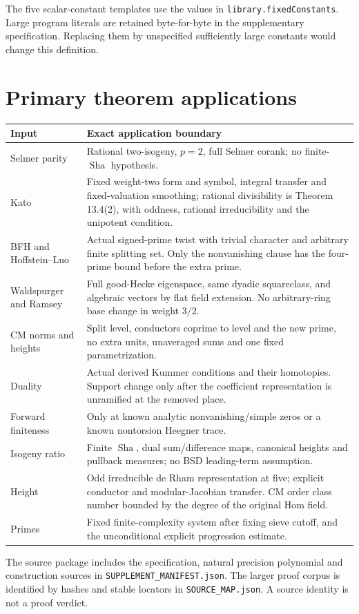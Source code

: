 \documentclass[11pt]{article}
\theoremstyle{definition}
\theoremstyle{remark}
\newcommand{\Sha}{\operatorname{Sha}}
\begin{document}
The five scalar-constant templates use the values in
\texttt{library.fixedConstants}. Large program literals are retained
byte-for-byte in the supplementary specification. Replacing them by
unspecified sufficiently large constants would change this definition.

\section{Primary theorem applications}
\begin{longtable}{p{}p{}}
\toprule Input & Exact application boundary\\\midrule\endhead
Selmer parity \cite{dd} & Rational two-isogeny, $p=2$, full Selmer corank;
no finite-$\Sha$ hypothesis.\\
Kato \cite{kato} & Fixed weight-two form and symbol, integral transfer and
fixed-valuation smoothing; rational divisibility is Theorem 13.4(2),
with oddness, rational irreducibility and the unipotent condition.\\
BFH and Hoffstein--Luo \cite{bfh,hl} & Actual signed-prime twist with
trivial character and arbitrary finite splitting set. Only the
nonvanishing clause has the four-prime bound before the extra prime.\\
Waldspurger and Ramsey \cite{waldspurger,ramsey} & Full good-Hecke
eigenspace, same dyadic squareclass, and algebraic vectors by flat
field extension. No arbitrary-ring base change in weight $3/2$.\\
CM norms and heights \cite{ccl,cst,cornutjetchev} & Split level,
conductors coprime to level and the new prime, no extra units,
unaveraged sums and one fixed parametrization.\\
Duality \cite{milne,nekovar} & Actual derived Kummer conditions and their
homotopies. Support change only after the coefficient representation
is unramified at the removed place.\\
Forward finiteness \cite{gz,kolyvagin} & Only at known analytic
nonvanishing/simple zeros or a known nontorsion Heegner trace.\\
Isogeny ratio \cite[proof of I.7.3]{milne} & Finite $\Sha$, dual
sum/difference maps, canonical heights and pullback measures;
no BSD leading-term assumption.\\
Height \cite{pan2022,javanpeykar,gr2014,fowler,cmheight,pazuki} &
Odd irreducible de Rham representation at five; explicit conductor
and modular-Jacobian transfer. CM order class number bounded by
the degree of the original Hom field.\\
Primes \cite{greentao,moebius,gtz,bmor} & Fixed finite-complexity system
after fixing sieve cutoff, and the unconditional explicit progression
estimate.\\\bottomrule
\end{longtable}
The source package includes the specification, natural precision polynomial
and construction sources in \nolinkurl{SUPPLEMENT_MANIFEST.json}.
The larger proof corpus is identified by hashes and stable locators in
\nolinkurl{SOURCE_MAP.json}. A source identity is not a proof verdict.
\end{document}
